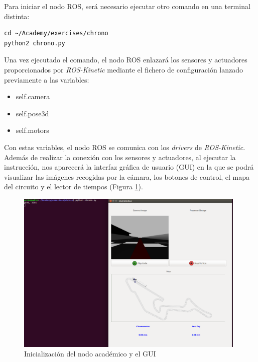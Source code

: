 Para iniciar el nodo ROS, será necesario ejecutar otro comando en una terminal distinta:

\lstset{language=bash, breaklines=true, basicstyle=\footnotesize}
\begin{lstlisting}[frame=single]
cd ~/Academy/exercises/chrono
python2 chrono.py
\end{lstlisting}

Una vez ejecutado el comando, el nodo ROS enlazará los sensores y actuadores proporcionados por \textit{ROS-Kinetic} mediante el fichero de configuración lanzado previamente a las variables:

\begin{itemize}
    \item self.camera
    \item self.pose3d
    \item self.motors
\end{itemize}

Con estas variables, el nodo ROS se comunica con los \textit{drivers} de \textit{ROS-Kinetic}.
Además de realizar la conexión con los sensores y actuadores, al ejecutar la instrucción, nos aparecerá la interfaz gráfica de usuario (GUI) en la que se podrá visualizar las imágenes recogidas por la cámara, los botones de control, el mapa del circuito y el lector de tiempos (Figura \ref{fig.inaGch}).

\begin{figure}[H]
  \begin{center}
    \includegraphics[width=0.98\textwidth]{figures/init_na_chrono.png}
		\caption{Inicialización del nodo académico y el GUI}
		\label{fig.inaGch}
		\end{center}
\end{figure}

